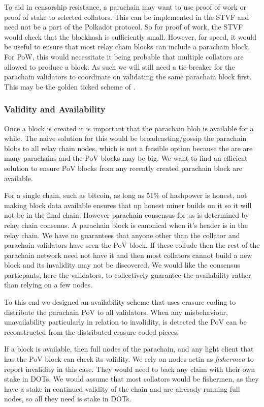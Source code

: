 To aid in censorship resistance, a parachain may want to use proof of work or proof of stake to selected collators. This can be implemented in the STVF and need not be a part of the Polkadot protocol. So for proof of work, the STVF would check that the blockhash is sufficiently small. However, for speed, it would be useful to ensure that most relay chain blocks can include a parachain block. For PoW, this would necessitate it being probable that multiple collators are allowed to produce a block. As such we will still need a tie-breaker for the parachain validators to coordinate on validating the same parachain block first. This may be the golden ticked scheme of \cite{2016:Wood:Polkadot}.


\subsubsection{Validity and Availability} \label{sec:validity-and-availability}
Once a block is created it is important that the parachain blob is available for a while.
The naive solution for this would be broadcasting/gossip the parachain blobs to all relay chain nodes, which is not a feasible option because the are are many parachains and the PoV blocks may be big.
We want to find an efficient solution to ensure PoV blocks from any recently created parachain block are available.

For a single chain, such as bitcoin, as long as 51\% of hashpower is honest, not making block data available ensures that np honest miner builds on it so it will not be in the final chain. However parachain consensus for us is determined by relay chain consenus. A parachain block is canonical when it's header is in the relay chain. We have no guarantees that anyone other than the collator and parachain validators have seen the PoV block. If these collude then the rest of the parachain network need not have it and then most collators cannot build a new block and its invalidity may not be discovered. We would like the consensus particpants, here the validators, to collectively guarantee the availability rather than relying on a few nodes.

To this end we designed an availability scheme that uses erasure coding \cite{} to distribute the parachain PoV to all validators.
When any misbehaviour, unavailability particularly in relation to invalidity, is detected the PoV can be reconstructed from the distributed erasure coded pieces.

If a block is available, then full nodes of the parachain, and any light client that has the PoV block can check its validity. We rely on nodes actin as {\em fishermen} to report invalidity in this case. They would need to back any claim with their own stake in DOTs. We would assume that most collators would be fishermen, as they have a stake in continued validity of the chain and are alrerady running full nodes, so all they need is stake in DOTs.


